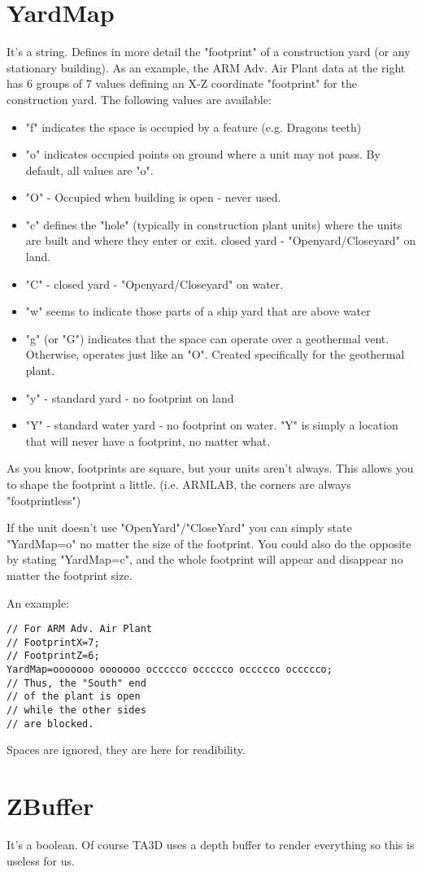 \documentclass[a4paper,10pt]{article}
\begin{document}
\section{YardMap}
It's a string. Defines in more detail the "footprint" of a construction yard (or any stationary building).  As an example, the ARM Adv. Air Plant data at the right has 6 groups of 7 values defining an X-Z coordinate "footprint" for the construction yard.  The following values are available:
\begin{itemize}
 \item "f" indicates the space is occupied by a feature (e.g. Dragons teeth)
 \item "o" indicates occupied points on ground where a unit may not pass.  By default, all values are "o".
 \item "O" - Occupied when building is open - never used.
 \item "c" defines the "hole" (typically in construction plant units) where the units are built and where they enter or exit.  closed yard - "Openyard/Closeyard" on land.
 \item "C" - closed yard - "Openyard/Closeyard" on water.
 \item "w" seems to indicate those parts of a ship yard that are above water
 \item "g" (or "G") indicates that the space can operate over a geothermal vent.   Otherwise, operates just like an "O".  Created specifically for the geothermal plant.
 \item "y" - standard yard - no footprint on land
 \item "Y" - standard water yard - no footprint on water.  "Y" is simply a location that will never have a footprint, no matter what.
\end{itemize}
As you know, footprints are square, but your units aren't always.
This allows you to shape the footprint a little.  (i.e. ARMLAB, the corners are always "footprintless")

If the unit doesn't use "OpenYard"/"CloseYard" you can simply state "YardMap=o" no matter the size of the footprint.  You could also do the opposite by stating "YardMap=c", and the whole footprint will appear and disappear no matter the footprint size.

An example:\\
\begin{verbatim}
// For ARM Adv. Air Plant
// FootprintX=7;
// FootprintZ=6;
YardMap=ooooooo ooooooo occccco occccco occccco occccco;
// Thus, the "South" end
// of the plant is open
// while the other sides
// are blocked.
\end{verbatim}

Spaces are ignored, they are here for readibility.

\section{ZBuffer}
It's a boolean. Of course TA3D uses a depth buffer to render everything so this is useless for us.
\end{document}
